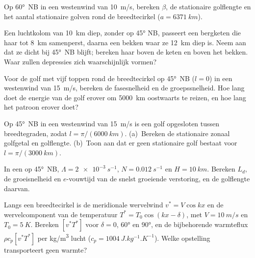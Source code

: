 \begin{exercise}[$\star$]\label{exo:b3:atmospheric-dynamics:4}
Op \ang{60}~NB in een westenwind van \qty{10}{m/s}, bereken $\beta$, de
stationaire golflengte en het aantal stationaire golven rond de
breedtecirkel ($a = \qty{6371}{km}$).
\end{exercise}

\begin{exercise}[$\star\star$]\label{exo:b3:atmospheric-dynamics:5}
Een luchtkolom van \qty{10}{km} diep, zonder  op \ang{45}
NB, passeert een bergketen die haar tot \qty{8}{km} samenperst, daarna een bekken
waar ze \qty{12}{km} diep is. Neem aan dat ze dicht bij \ang{45}~NB blijft; bereken haar
 boven de keten en boven het bekken. Waar zullen
depressies zich waarschijnlijk vormen?
\end{exercise}

\begin{exercise}[$\star\star$]\label{exo:b3:atmospheric-dynamics:6}
Voor de golf met vijf toppen rond de breedtecirkel op \ang{45}~NB ($l = 0$) in een
westenwind van \qty{15}{m/s}, bereken de fasesnelheid en de groepssnelheid.
Hoe lang doet de energie van de golf erover om \qty{5000}{km} oostwaarts te reizen, en
hoe lang het patroon erover doet?
\end{exercise}

\begin{exercise}[$\star\star$]\label{exo:b3:atmospheric-dynamics:7}
Op \ang{45}~NB in een westenwind van \qty{15}{m/s} is een golf opgesloten tussen
breedtegraden, zodat $l = \pi/(\qty{6000}{km})$. (a)~Bereken de stationaire
zonaal golfgetal en golflengte. (b)~Toon aan dat er geen stationaire golf bestaat voor
$l = \pi/(\qty{3000}{km})$.
\end{exercise}

\begin{exercise}[$\star\star$]\label{exo:b3:atmospheric-dynamics:8}
In een  op \ang{45}~NB, $\Lambda = \qty{2e-3}{s^{-1}}$, $N =
\qty{0.012}{s^{-1}}$ en $H = \qty{10}{km}$. Bereken $L_d$, de groeisnelheid
en $e$-vouwtijd van de snelst groeiende verstoring, en de
golflengte daarvan.
\end{exercise}

\begin{exercise}[$\star\star$]\label{exo:b3:atmospheric-dynamics:9}
Langs een breedtecirkel is de meridionale wervelwind $v^* = V\cos kx$ en de
wervelcomponent van de temperatuur $T^* = T_0\cos(kx - \delta)$, met $V = \qty{10}{m/s}$ en
$T_0 = \qty{5}{K}$. Bereken $[v^*T^*]$ voor $\delta = 0$, \ang{60} en
\ang{90}, en de bijbehorende warmteflux $\rho c_p[v^*T^*]$ per
\unit{kg/m^3} lucht ($c_p = \qty{1004}{J.kg^{-1}.K^{-1}}$). Welke
opstelling transporteert geen warmte?
\end{exercise}

